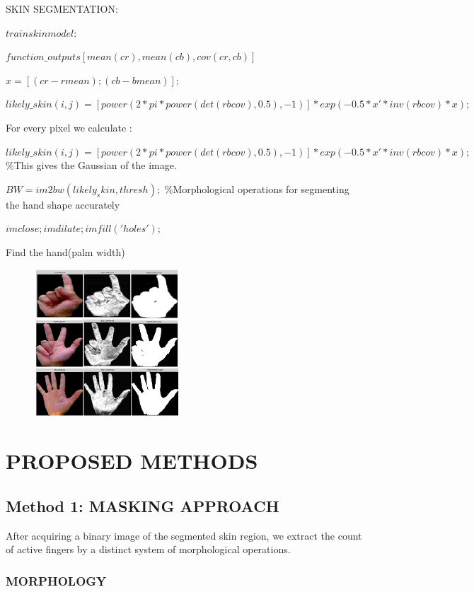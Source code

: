 \documentclass[conference]{IEEEtran}
\begin{document}
SKIN SEGMENTATION:

$train skin model : $

$function\_outputs[ mean(cr) ,mean(cb), cov(cr,cb)]$

$x = [(cr-rmean);(cb-bmean)];$

$likely\_skin(i,j) = [power(2*pi*power(det(rbcov),0.5),-1)]*exp(-0.5* x'*inv(rbcov)* x);$

For every pixel we calculate :

$likely\_skin(i,j) = [power(2*pi*power(det(rbcov),0.5),-1)]*exp(-0.5* x'*inv(rbcov)* x);$ \%This gives the Gaussian of the image. 

$BW = im2bw(likely_skin,thresh); $ \%Morphological operations for segmenting the hand shape accurately

$imclose;imdilate;imfill('holes');$

Find the hand(palm width) 

\begin{figure}[h!]
	\centering
	\includegraphics[width = 5.5cm, height = 5.5cm]{grid1}
\end{figure}



\section{PROPOSED METHODS}

\subsection{Method 1: MASKING APPROACH }

After acquiring a binary image of the segmented skin region, we extract the count of active fingers by a distinct system of morphological operations.


\subsubsection{MORPHOLOGY}
\end{document}
